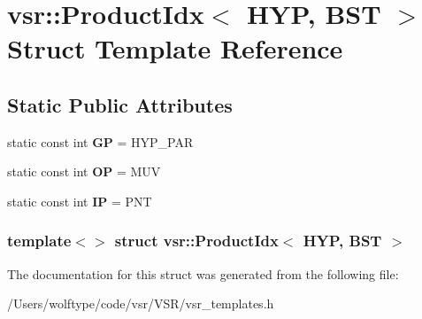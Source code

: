 \hypertarget{structvsr_1_1_product_idx_3_01_h_y_p_00_01_b_s_t_01_4}{\section{vsr\-:\-:Product\-Idx$<$ H\-Y\-P, B\-S\-T $>$ Struct Template Reference}
\label{structvsr_1_1_product_idx_3_01_h_y_p_00_01_b_s_t_01_4}
}
\subsection*{Static Public Attributes}
\begin{DoxyCompactItemize}
\item 
\hypertarget{structvsr_1_1_product_idx_3_01_h_y_p_00_01_b_s_t_01_4_abdbd34ce3dca1fd8859e2db452362805}{static const int {\bfseries G\-P} = H\-Y\-P\-\_\-\-P\-A\-R}\label{structvsr_1_1_product_idx_3_01_h_y_p_00_01_b_s_t_01_4_abdbd34ce3dca1fd8859e2db452362805}

\item 
\hypertarget{structvsr_1_1_product_idx_3_01_h_y_p_00_01_b_s_t_01_4_aa21a8b64696c20adc09e6e95d7c0438f}{static const int {\bfseries O\-P} = M\-U\-V}\label{structvsr_1_1_product_idx_3_01_h_y_p_00_01_b_s_t_01_4_aa21a8b64696c20adc09e6e95d7c0438f}

\item 
\hypertarget{structvsr_1_1_product_idx_3_01_h_y_p_00_01_b_s_t_01_4_a2dbdea08ed9b12056c1c137a47e1e2e7}{static const int {\bfseries I\-P} = P\-N\-T}\label{structvsr_1_1_product_idx_3_01_h_y_p_00_01_b_s_t_01_4_a2dbdea08ed9b12056c1c137a47e1e2e7}

\end{DoxyCompactItemize}
\subsubsection*{template$<$$>$ struct vsr\-::\-Product\-Idx$<$ H\-Y\-P, B\-S\-T $>$}



The documentation for this struct was generated from the following file\-:\begin{DoxyCompactItemize}
\item 
/\-Users/wolftype/code/vsr/\-V\-S\-R/vsr\-\_\-templates.\-h\end{DoxyCompactItemize}
